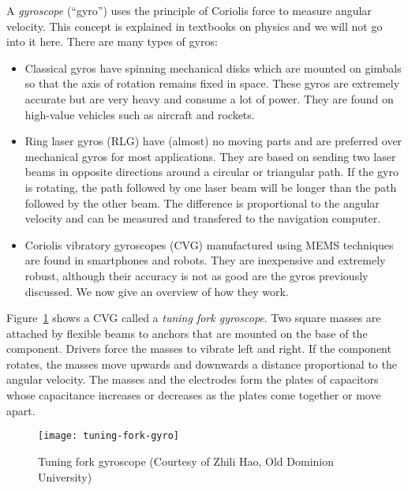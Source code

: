 A \emph{gyroscope} (``gyro'') uses the principle of Coriolis force to measure angular velocity. This concept is explained in textbooks on physics and we will not go into it here. There are many types of gyros:
\begin{itemize}
\item Classical gyros have spinning mechanical disks which are mounted on gimbals so that the axis of rotation remains fixed in space. These gyros are extremely accurate but are very heavy and consume a lot of power. They are found on high-value vehicles such as aircraft and rockets.
\item Ring laser gyros (RLG) have (almost) no moving parts and are preferred over mechanical gyros for most applications. They are based on sending two laser beams in opposite directions around a circular or triangular path. If the gyro is rotating, the path followed by one laser beam will be longer than the path followed by the other beam. The difference is proportional to the angular velocity and can be measured and transfered to the navigation computer.
\item Coriolis vibratory gyroscopes (CVG) manufactured using MEMS techniques are found in smartphones and robots. They are inexpensive and extremely robust, although their accuracy is not as good are the gyros previously discussed. We now give an overview of how they work.
\end{itemize}

Figure~\ref{fig.tuning-gyro-image} shows a CVG called a \emph{tuning fork gyroscope}. Two square masses are attached by flexible beams to anchors that are mounted on the base of the component. Drivers force the masses to vibrate left and right. If the component rotates, the masses move upwards and downwards a distance proportional to the angular velocity. The masses and the electrodes form the plates of capacitors whose capacitance increases or decreases as the plates come together or move apart.

\begin{figure}
\begin{center}
\texttt{[image: tuning-fork-gyro]}
\end{center}
\caption{Tuning fork gyroscope (Courtesy of Zhili Hao, Old Dominion University)}\label{fig.tuning-gyro-image}
\end{figure}

